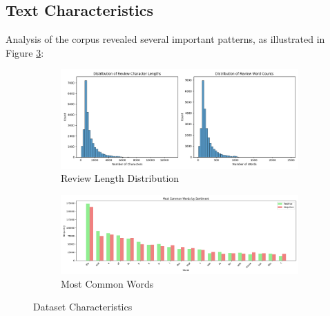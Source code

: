 \documentclass[numbers,nonatbib]{article}
\begin{document}
\subsection{Text Characteristics}
Analysis of the corpus revealed several important patterns, as illustrated in Figure \ref{fig:data_analysis}:

\begin{figure}[h]
\centering
\begin{subfigure}{.48\textwidth}
    \centering
    \includegraphics[width=\linewidth]{../analysis/plots/length_distributions.png}
    \caption{Review Length Distribution}
    \label{fig:length_dist}
\end{subfigure}
\hfill
\begin{subfigure}{.48\textwidth}
    \centering
    \includegraphics[width=\linewidth]{../analysis/plots/word_frequencies.png}
    \caption{Most Common Words}
    \label{fig:word_freq}
\end{subfigure}
\caption{Dataset Characteristics}
\label{fig:data_analysis}
\end{figure}
\end{document}
